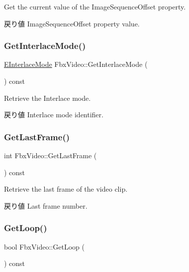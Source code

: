 Get the current value of the Image\+Sequence\+Offset property. \begin{DoxyReturn}{戻り値}
Image\+Sequence\+Offset property value. 
\end{DoxyReturn}
\mbox{\label{class_fbx_video_ac86d64d43fd683b6573b4bfa636aa9d1}} 
\subsubsection{\texorpdfstring{Get\+Interlace\+Mode()}{GetInterlaceMode()}}
{\footnotesize\ttfamily \hyperlink{class_fbx_video_a1e60229c28a15e29289f3f00b23aa215}{E\+Interlace\+Mode} Fbx\+Video\+::\+Get\+Interlace\+Mode (\begin{DoxyParamCaption}{ }\end{DoxyParamCaption}) const}

Retrieve the Interlace mode. \begin{DoxyReturn}{戻り値}
Interlace mode identifier. 
\end{DoxyReturn}
\mbox{\label{class_fbx_video_abcc991da628ef1ae31f15a64d773e8be}} 
\subsubsection{\texorpdfstring{Get\+Last\+Frame()}{GetLastFrame()}}
{\footnotesize\ttfamily int Fbx\+Video\+::\+Get\+Last\+Frame (\begin{DoxyParamCaption}{ }\end{DoxyParamCaption}) const}

Retrieve the last frame of the video clip. \begin{DoxyReturn}{戻り値}
Last frame number. 
\end{DoxyReturn}
\mbox{\label{class_fbx_video_a6b78fbe7939fb49f51c1d381fe927816}} 
\subsubsection{\texorpdfstring{Get\+Loop()}{GetLoop()}}
{\footnotesize\ttfamily bool Fbx\+Video\+::\+Get\+Loop (\begin{DoxyParamCaption}{ }\end{DoxyParamCaption}) const}

